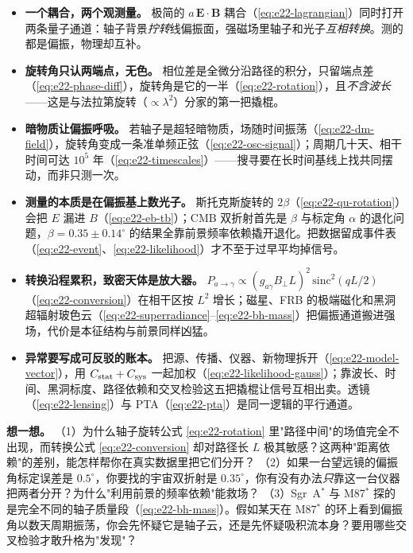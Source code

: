 \begin{itemize}
\item \textbf{一个耦合，两个观测量。} 极简的 \(a\,\bm E\cdot\bm B\) 耦合（\eqref{eq:e22-lagrangian}）同时打开两条量子通道：轴子背景\emph{拧转}线偏振面，强磁场里轴子和光子\emph{互相转换}。测的都是偏振，物理却互补。
\item \textbf{旋转角只认两端点，无色。} 相位差是全微分沿路径的积分，只留端点差（\eqref{eq:e22-phase-diff}），旋转角是它的一半（\eqref{eq:e22-rotation}），且\emph{不含波长}——这是与法拉第旋转（\(\propto\lambda^2\)）分家的第一把撬棍。
\item \textbf{暗物质让偏振呼吸。} 若轴子是超轻暗物质，场随时间振荡（\eqref{eq:e22-dm-field}），旋转角变成一条准单频正弦（\eqref{eq:e22-osc-signal}）；周期几十天、相干时间可达 \(10^5\) 年（\eqref{eq:e22-timescales}）——搜寻要在长时间基线上找共同摆动，而非只测一次。
\item \textbf{测量的本质是在偏振基上数光子。} 斯托克斯旋转的 \(2\beta\)（\eqref{eq:e22-qu-rotation}）会把 \(E\) 漏进 \(B\)（\eqref{eq:e22-eb-tb}）；CMB 双折射首先是 \(\beta\) 与标定角 \(\alpha\) 的退化问题，\(\beta=0.35\pm0.14^\circ\) 的结果全靠前景频率依赖撬开退化。把数据留成事件表（\eqref{eq:e22-event}、\eqref{eq:e22-likelihood}）才不至于过早平均掉信号。
\item \textbf{转换沿程累积，致密天体是放大器。} \(P_{a\to\gamma}\propto(g_{a\gamma}B_\perp L)^2\,\mathrm{sinc}^2(qL/2)\)（\eqref{eq:e22-conversion}）在相干区按 \(L^2\) 增长；磁星、FRB 的极端磁化和黑洞超辐射玻色云（\eqref{eq:e22-superradiance}--\eqref{eq:e22-bh-mass}）把偏振通道搬进强场，代价是本征结构与前景同样凶猛。
\item \textbf{异常要写成可反驳的账本。} 把源、传播、仪器、新物理拆开（\eqref{eq:e22-model-vector}），用 \(C_{\rm stat}+C_{\rm sys}\) 一起加权（\eqref{eq:e22-likelihood-gauss}）；靠波长、时间、黑洞标度、路径依赖和交叉检验这五把撬棍让信号互相出卖。透镜（\eqref{eq:e22-lensing}）与 PTA（\eqref{eq:e22-pta}）是同一逻辑的平行通道。
\end{itemize}

\noindent\textbf{想一想。}
（1）为什么轴子旋转公式 \eqref{eq:e22-rotation} 里"路径中间"的场值完全不出现，而转换公式 \eqref{eq:e22-conversion} 却对路径长 \(L\) 极其敏感？这两种"距离依赖"的差别，能怎样帮你在真实数据里把它们分开？
（2）如果一台望远镜的偏振角标定误差是 \(0.5^\circ\)，你要找的宇宙双折射是 \(0.35^\circ\)，你有没有办法\emph{只}靠这一台仪器把两者分开？为什么"利用前景的频率依赖"能救场？
（3）Sgr~A\(^*\) 与 M87\(^*\) 探的是完全不同的轴子质量段（\eqref{eq:e22-bh-mass}）。假如某天在 M87\(^*\) 的环上看到偏振角以数天周期振荡，你会先怀疑它是轴子云，还是先怀疑吸积流本身？要用哪些交叉检验才敢升格为"发现"？
